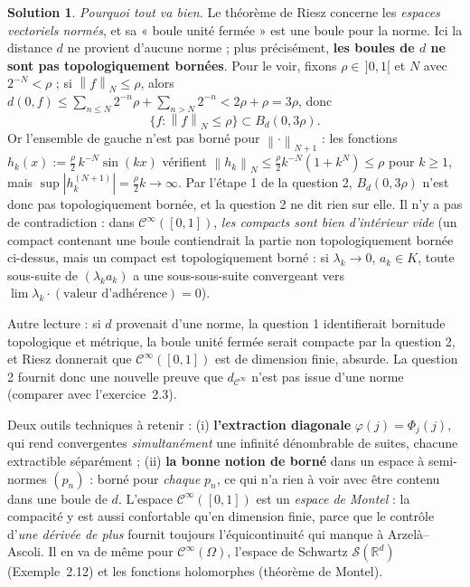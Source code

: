 \documentclass[11pt,a4paper]{article}
\newcommand{\R}{\mathbb{R}}
\newcommand{\norm}[1]{\left\|#1\right\|}
\newcommand{\Cinf}{\mathcal{C}^\infty}
\theoremstyle{definition}
\newtheorem*{solution}{Solution}
\begin{document}
\begin{solution}
\emph{Pourquoi tout va bien.} Le théorème de Riesz concerne les \emph{espaces vectoriels normés}, et sa « boule unité fermée » est une boule pour la norme. Ici la distance $d$ ne provient d'aucune norme ; plus précisément, \textbf{les boules de $d$ ne sont pas topologiquement bornées}. Pour le voir, fixons $\rho\in\,]0,1[$ et $N$ avec $2^{-N}<\rho$ ; si $\norm f_N\le\rho$, alors $d(0,f)\le\sum_{n\le N}2^{-n}\rho+\sum_{n>N}2^{-n}<2\rho+\rho=3\rho$, donc
\[
\{f : \norm f_N\le\rho\}\subset B_d(0,3\rho).
\]
Or l'ensemble de gauche n'est pas borné pour $\norm\cdot_{N+1}$ : les fonctions $h_k(x):=\frac{\rho}{2}\,k^{-N}\sin(kx)$ vérifient $\norm{h_k}_N\le\frac\rho2k^{-N}(1+k^N)\le\rho$ pour $k\ge1$, mais $\sup|h_k^{(N+1)}|=\frac\rho2k\to\infty$. Par l'étape 1 de la question 2, $B_d(0,3\rho)$ n'est donc pas topologiquement bornée, et la question 2 ne dit rien sur elle. Il n'y a pas de contradiction : dans $\Cinf([0,1])$, \emph{les compacts sont bien d'intérieur vide} (un compact contenant une boule contiendrait la partie non topologiquement bornée ci-dessus, mais un compact est topologiquement borné : si $\lambda_k\to0$, $a_k\in K$, toute sous-suite de $(\lambda_ka_k)$ a une sous-sous-suite convergeant vers $\lim\lambda_k\cdot(\text{valeur d'adhérence})=0$).

Autre lecture : si $d$ provenait d'une norme, la question 1 identifierait bornitude topologique et métrique, la boule unité fermée serait compacte par la question 2, et Riesz donnerait que $\Cinf([0,1])$ est de dimension finie, absurde. La question 2 fournit donc une nouvelle preuve que $d_{\Cinf}$ n'est pas issue d'une norme (comparer avec l'exercice~2.3).
\end{solution}

\begin{pointcle}
Deux outils techniques à retenir : (i) \textbf{l'extraction diagonale} $\varphi(j)=\Phi_j(j)$, qui rend convergentes \emph{simultanément} une infinité dénombrable de suites, chacune extractible séparément ; (ii) \textbf{la bonne notion de borné} dans un espace à semi-normes $(p_n)$ : borné pour \emph{chaque} $p_n$, ce qui n'a rien à voir avec être contenu dans une boule de $d$. L'espace $\Cinf([0,1])$ est un \emph{espace de Montel} : la compacité y est aussi confortable qu'en dimension finie, parce que le contrôle d'\emph{une dérivée de plus} fournit toujours l'équicontinuité qui manque à Arzelà--Ascoli. Il en va de même pour $\Cinf(\Omega)$, l'espace de Schwartz $\mathcal S(\R^d)$ (Exemple~2.12) et les fonctions holomorphes (théorème de Montel).
\end{pointcle}
\end{document}
